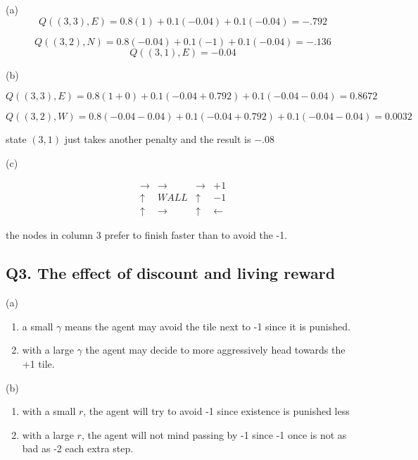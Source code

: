\documentclass{report}
\begin{document}
(a)
\begin{equation}
    Q((3,3),E)=0.8(1)+0.1(-0.04)+0.1(-0.04) = -.792
\end{equation}

\begin{equation}
    Q((3,2),N)=0.8(-0.04)+0.1(-1)+0.1(-0.04) = -.136
\end{equation}
\begin{equation}
    Q((3,1),E)=-0.04
\end{equation}

(b)

\begin{equation}
    Q((3,3),E)=0.8(1+0)+0.1(-0.04+0.792)+0.1(-0.04-0.04) = 0.8672
\end{equation}

\begin{equation}
    Q((3,2),W)=0.8(-0.04-0.04)+0.1(-0.04+0.792)+0.1(-0.04-0.04) = 0.0032
\end{equation}

state \((3,1)\) just takes another penalty and the result is \(-.08\)

(c)


\begin{equation}
    \begin{matrix}
        \rightarrow & \rightarrow & \rightarrow &+1\\
        \uparrow & WALL & \uparrow & -1\\
        \uparrow & \rightarrow & \uparrow & \leftarrow
    \end{matrix}
\end{equation}

the nodes in column 3 prefer to finish faster than to avoid the -1.

\subsection*{Q3. The effect of discount and living reward}

(a)

\begin{enumerate}
    \item a small \(\gamma\) means the agent may avoid the tile next to -1 since it is punished. 
    \item with a large \(\gamma\) the agent may decide to more aggressively head towards the +1 tile.
\end{enumerate}

(b)

\begin{enumerate}
    \item with a small \(r\), the agent will try to avoid -1 since existence is punished less
    \item with a large \(r\), the agent will not mind passing by -1 since -1 once is not as bad as -2 each extra step. 
\end{enumerate}
\end{document}

